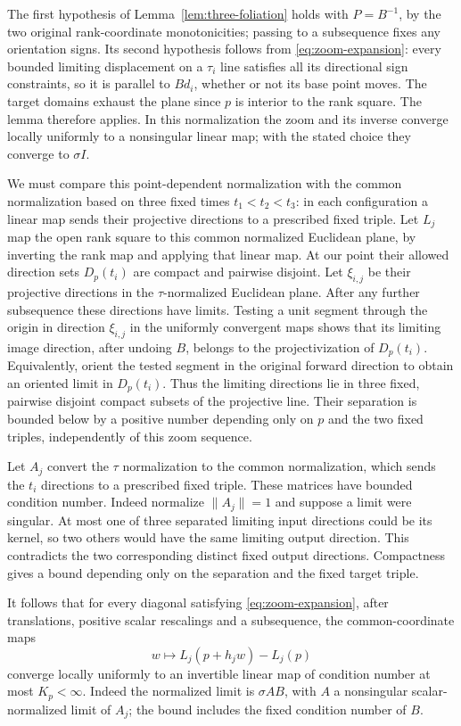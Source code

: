 The first hypothesis of Lemma~\ref{lem:three-foliation} holds with
$P=B^{-1}$, by the two original rank-coordinate monotonicities;
passing to a subsequence fixes any orientation signs.  Its second
hypothesis follows from \eqref{eq:zoom-expansion}: every bounded limiting displacement on
a $\tau_i$ line satisfies all its directional sign constraints, so
it is parallel to $B d_i$, whether or not its base point moves.
The target domains exhaust the plane since $p$ is interior to the
rank square.  The lemma therefore applies.  In this normalization
the zoom and its inverse converge locally uniformly to a nonsingular
linear map; with the stated choice they converge to $\sigma I$.

We must compare this point-dependent normalization with the common
normalization based on three fixed times $t_1<t_2<t_3$: in each
configuration a linear map sends their projective directions to a
prescribed fixed triple.  Let $L_j$ map the open rank square to this
common normalized Euclidean plane, by inverting the rank map and
applying that linear map.  At our point
their allowed direction sets $D_p(t_i)$ are compact and pairwise
disjoint.  Let $\xi_{i,j}$ be their projective directions in the
$\tau$-normalized Euclidean plane.  After any further subsequence
these directions have limits.  Testing a unit segment through the
origin in direction $\xi_{i,j}$ in the uniformly convergent maps
shows that its limiting image direction, after undoing $B$, belongs
to the projectivization of $D_p(t_i)$.  Equivalently, orient the
tested segment in the original forward direction to obtain an
oriented limit in $D_p(t_i)$.  Thus the limiting directions lie in three fixed,
pairwise disjoint compact subsets of the projective line.  Their
separation is bounded below by a positive number depending only
on $p$ and the two fixed triples, independently of this zoom sequence.

Let $A_j$ convert the $\tau$ normalization to the common normalization,
which sends the $t_i$ directions to a prescribed fixed triple.
These matrices have bounded condition number.  Indeed normalize
$\|A_j\|=1$ and suppose a limit were singular.  At most one of three
separated limiting input directions could be its kernel, so two
others would have the same limiting output direction.  This
contradicts the two corresponding distinct fixed output directions.
Compactness gives a bound depending only on the separation and the
fixed target triple.

It follows that for every diagonal satisfying \eqref{eq:zoom-expansion}, after translations,
positive scalar rescalings and a subsequence, the common-coordinate
maps
\[
 w\longmapsto L_j(p+h_jw)-L_j(p)
\]
converge locally uniformly to an invertible linear map of condition
number at most $K_p<\infty$.  Indeed the normalized limit is
$\sigma A B$, with $A$ a nonsingular scalar-normalized limit of
$A_j$; the bound includes the fixed condition number of $B$.

